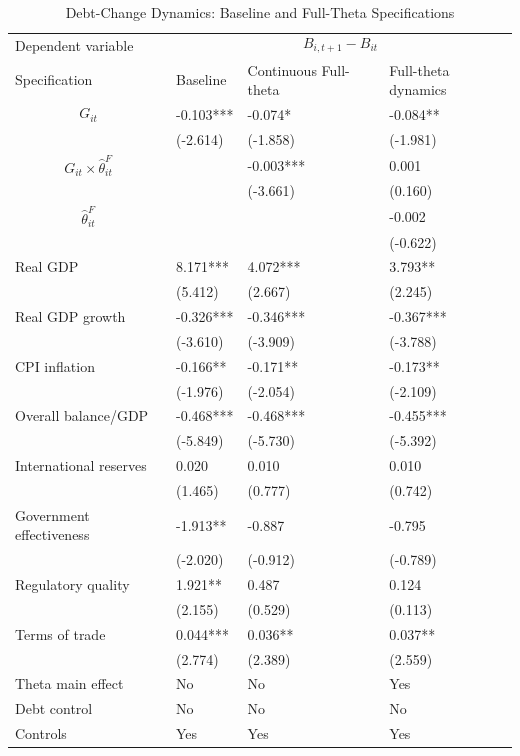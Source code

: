 \begin{table}[H]\centering
\begin{threeparttable}
\caption{Debt-Change Dynamics: Baseline and Full-Theta Specifications}
\label{tab:debt_change_combined_fulltheta}
\scriptsize
\begin{tabularx}{\textwidth}{lYYY}
\toprule
Dependent variable &  \\
\cmidrule(lr){2-4}
Specification & Baseline & Continuous Full-theta & Full-theta dynamics \\
\midrule
$$G_{it}$$ & -0.103*** & -0.074* & -0.084** \\
 & (-2.614) & (-1.858) & (-1.981) \\
$$G_{it}\times\widehat{\theta}^{F}_{it}$$ &  & -0.003*** & 0.001 \\
 &  & (-3.661) & (0.160) \\
$$\widehat{\theta}^{F}_{it}$$ &  &  & -0.002 \\
 &  &  & (-0.622) \\
Real GDP & 8.171*** & 4.072*** & 3.793** \\
 & (5.412) & (2.667) & (2.245) \\
Real GDP growth & -0.326*** & -0.346*** & -0.367*** \\
 & (-3.610) & (-3.909) & (-3.788) \\
CPI inflation & -0.166** & -0.171** & -0.173** \\
 & (-1.976) & (-2.054) & (-2.109) \\
Overall balance/GDP & -0.468*** & -0.468*** & -0.455*** \\
 & (-5.849) & (-5.730) & (-5.392) \\
International reserves & 0.020 & 0.010 & 0.010 \\
 & (1.465) & (0.777) & (0.742) \\
Government effectiveness & -1.913** & -0.887 & -0.795 \\
 & (-2.020) & (-0.912) & (-0.789) \\
Regulatory quality & 1.921** & 0.487 & 0.124 \\
 & (2.155) & (0.529) & (0.113) \\
Terms of trade & 0.044*** & 0.036** & 0.037** \\
 & (2.774) & (2.389) & (2.559) \\
\midrule
Theta main effect & No & No & Yes \\
Debt control & No & No & No \\
Controls & Yes & Yes & Yes \\

\end{tabularx}
\end{threeparttable}
\end{table}
